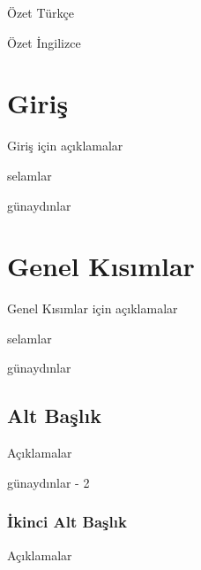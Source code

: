 \documentclass[12pt, oneside]{iufenbil}
\begin{document}
\begin{summary}[tr]
	Özet Türkçe
\end{summary}

\begin{summary}[en]
	Özet İngilizce 
\end{summary}

\startofthesis %
%
%
%
%
%

\section{Giriş}
	Giriş için açıklamalar

\begin{definition}
	selamlar
\end{definition}
	
\begin{definition}
	günaydınlar
\end{definition}

\section{Genel Kısımlar}
	Genel Kısımlar için açıklamalar
	
\begin{definition}
	selamlar
\end{definition}

\begin{definition}
	günaydınlar
\end{definition}
	
\subsection{Alt Başlık}
	Açıklamalar
	
\begin{definition}
	günaydınlar - 2
\end{definition}

\subsubsection{İkinci Alt Başlık}
	Açıklamalar
	
\end{document}
